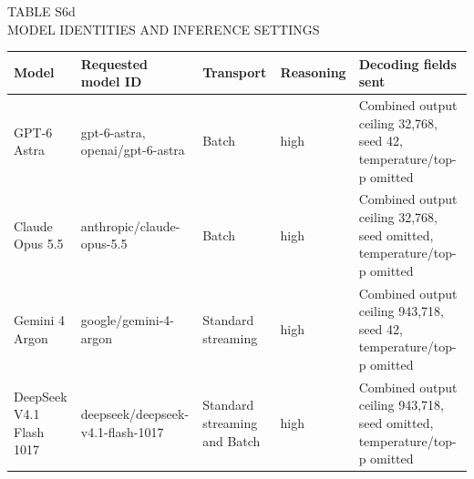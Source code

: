 \begin{table}[t]
\centering
\begingroup
\fontsize{10}{12}\selectfont
TABLE S6d\\
MODEL IDENTITIES AND INFERENCE SETTINGS\par\smallskip
\setlength{\tabcolsep}{4pt}
\renewcommand{\arraystretch}{1.15}
\begin{tabularx}{\linewidth}{@{}>{\hsize=0.85\hsize\raggedright\arraybackslash}X>{\hsize=1.2\hsize\raggedright\arraybackslash}X>{\hsize=0.9\hsize\raggedright\arraybackslash}X>{\hsize=0.6\hsize\raggedright\arraybackslash}X>{\hsize=1.45\hsize\raggedright\arraybackslash}X@{}}
\toprule
\textbf{Model} & \textbf{Requested model ID} & \textbf{Transport} & \textbf{Reasoning} & \textbf{Decoding fields sent} \\
\midrule
GPT-6 Astra & gpt-6-astra, openai/gpt-6-astra & Batch & high & Combined output ceiling 32,768, seed 42, temperature/top-p omitted \\
Claude Opus 5.5 & anthropic/claude-opus-5.5 & Batch & high & Combined output ceiling 32,768, seed omitted, temperature/top-p omitted \\
Gemini 4 Argon & google/gemini-4-argon & Standard streaming & high & Combined output ceiling 943,718, seed 42, temperature/top-p omitted \\
DeepSeek V4.1 Flash 1017 & deepseek/deepseek-v4.1-flash-1017 & Standard streaming and Batch & high & Combined output ceiling 943,718, seed omitted, temperature/top-p omitted \\
\bottomrule
\end{tabularx}
\endgroup
\end{table}
